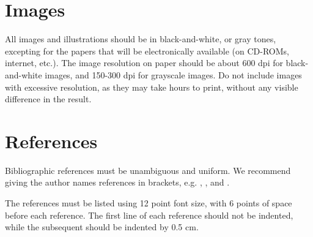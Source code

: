 \documentclass[12pt]{article}
\begin{document}
\section{Images}

All images and illustrations should be in black-and-white, or gray tones,
excepting for the papers that will be electronically available (on CD-ROMs,
internet, etc.). The image resolution on paper should be about 600 dpi for
black-and-white images, and 150-300 dpi for grayscale images.  Do not include
images with excessive resolution, as they may take hours to print, without any
visible difference in the result. 

\section{References}

Bibliographic references must be unambiguous and uniform.  We recommend giving
the author names references in brackets, e.g. \cite{knuth:84},
\cite{boulic:91}, and \cite{smith:99}.

The references must be listed using 12 point font size, with 6 points of space
before each reference. The first line of each reference should not be
indented, while the subsequent should be indented by 0.5 cm.



\end{document}
